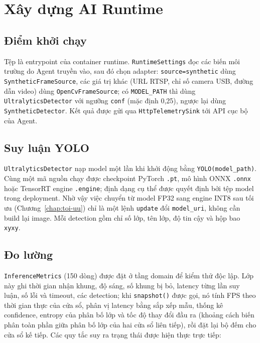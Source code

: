 \section{Xây dựng AI Runtime}

\subsection{Điểm khởi chạy}

Tệp  là entrypoint của container runtime.
\texttt{RuntimeSettings} đọc các biến môi trường do Agent truyền vào, sau đó chọn
adapter: \texttt{source=synthetic} dùng \texttt{SyntheticFrameSource}, các giá trị
khác (URL RTSP, chỉ số camera USB, đường dẫn video) dùng \texttt{OpenCvFrameSource};
có \texttt{MODEL\_PATH} thì dùng \texttt{UltralyticsDetector} với ngưỡng
\texttt{conf} (mặc định 0,25), ngược lại dùng \texttt{SyntheticDetector}. Kết quả
được gửi qua \texttt{HttpTelemetrySink} tới API cục bộ của Agent.

\subsection{Suy luận YOLO}

\texttt{UltralyticsDetector} nạp model một lần khi khởi động bằng
\texttt{YOLO(model\_path)}. Cùng một mã nguồn chạy được checkpoint PyTorch
\texttt{.pt}, mô hình ONNX \texttt{.onnx} hoặc TensorRT engine \texttt{.engine};
định dạng cụ thể được quyết định bởi tệp model trong deployment. Nhờ vậy việc
chuyển từ model FP32 sang engine INT8 sau tối ưu (Chương~\ref{chap:toi-uu}) chỉ
là một lệnh \texttt{update} đổi \texttt{model\_uri}, không cần build lại image.
Mỗi detection gồm chỉ số lớp, tên lớp, độ tin cậy và hộp bao \texttt{xyxy}.

\subsection{Đo lường}

\texttt{InferenceMetrics} (150 dòng) được đặt ở tầng domain để kiểm thử độc lập.
Lớp này ghi thời gian nhận khung, độ sáng, số khung bị bỏ, latency từng lần suy
luận, số lỗi và timeout, các detection; khi \texttt{snapshot()} được gọi, nó tính
FPS theo thời gian thực của cửa sổ, phân vị latency bằng sắp xếp mẫu, thống kê
confidence, entropy của phân bố lớp và tốc độ thay đổi đầu ra (khoảng cách
biến phân toàn phần giữa phân bố lớp của hai cửa sổ liên tiếp), rồi đặt lại bộ
đếm cho cửa sổ kế tiếp. Các quy tắc suy ra trạng thái được hiện thực trực tiếp:

